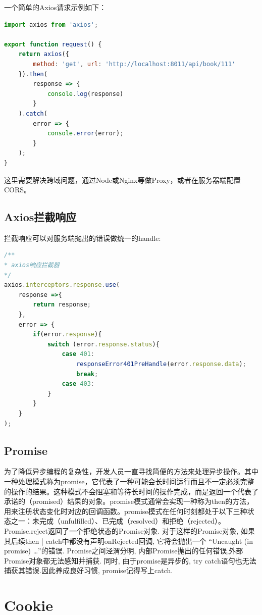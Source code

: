 \documentclass[letter]{book}
\begin{document}
一个简单的Axios请求示例如下：

\begin{lstlisting}[language=JavaScript]
import axios from 'axios';

export function request() {
	return axios({
		method: 'get', url: 'http://localhost:8011/api/book/111'
	}).then(
		response => {
			console.log(response)
		}
	).catch(
		error => {
			console.error(error);
		}
	);
}
\end{lstlisting}


这里需要解决跨域问题，通过Node或Nginx等做Proxy，或者在服务器端配置CORS。

\subsection{Axios拦截响应}

拦截响应可以对服务端抛出的错误做统一的handle:

\begin{lstlisting}[language=JavaScript]
/**
* axios响应拦截器
*/
axios.interceptors.response.use(
	response =>{
		return response;
	},
	error => {
		if(error.response){
			switch (error.response.status){
				case 401:
					responseError401PreHandle(error.response.data);
					break;
				case 403:
			}
		}
	}
);
\end{lstlisting}

\subsection{Promise}

为了降低异步编程的复杂性，开发人员一直寻找简便的方法来处理异步操作。其中一种处理模式称为promise，它代表了一种可能会长时间运行而且不一定必须完整的操作的结果。这种模式不会阻塞和等待长时间的操作完成，而是返回一个代表了承诺的（promised）结果的对象。promise模式通常会实现一种称为then的方法，用来注册状态变化时对应的回调函数。promise模式在任何时刻都处于以下三种状态之一：未完成（unfulfilled）、已完成（resolved）和拒绝（rejected）。Promise.reject返回了一个拒绝状态的Promise对象. 对于这样的Promise对象, 如果其后续then | catch中都没有声明onRejected回调, 它将会抛出一个 “Uncaught (in promise) …”的错误. Promise之间泾渭分明, 内部Promise抛出的任何错误,外部Promise对象都无法感知并捕获. 同时, 由于promise是异步的, try catch语句也无法捕获其错误.因此养成良好习惯, promise记得写上catch.

\section{Cookie}
\end{document}
